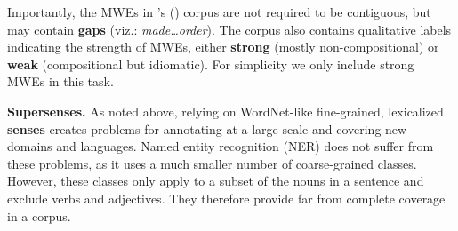 \documentclass[11pt,letterpaper]{article}
\newcommand{\citeposs}[1]{\citeauthor{#1}'s (\citeyear{#1})}
\newcommand{\ensuretext}[1]{#1}
\newcommand{\nssmarker}{\ensuretext{\textcolor{magenta}{\ensuremath{^{\textsc{NS}}_{\textsc{S}}}}}}
\newcommand{\arkcomment}[3]{\ensuretext{\textcolor{#3}{[#1 #2]}}}
\newcommand{\nss}[1]{\arkcomment{\nssmarker}{#1}{magenta}}
\newcommand{\lex}[1]{\textit{#1}} %
\newcommand{\longversion}[1]{#1} %
\begin{document}
Importantly, the MWEs in \citeposs{schneider-14-corpus} corpus are not required to be contiguous, 
but may contain \textbf{gaps} (viz.: \lex{made\ldots order}). The corpus also contains qualitative labels indicating the strength of MWEs, either \textbf{strong} (mostly non-compositional) or \textbf{weak} (compositional but idiomatic). For simplicity we only include strong MWEs in this task.

\textbf{Supersenses.}
% 
As noted above, relying on WordNet-like fine-grained, lexicalized \textbf{senses} 
creates problems for annotating at a large scale and covering new domains and languages. 
Named entity recognition (NER) does not suffer from these problems, 
as it uses a much smaller number of coarse-grained classes. 
However, these classes only apply to a subset of the nouns in a sentence and exclude verbs and adjectives.
They therefore provide far from complete coverage in a corpus.
\end{document}
